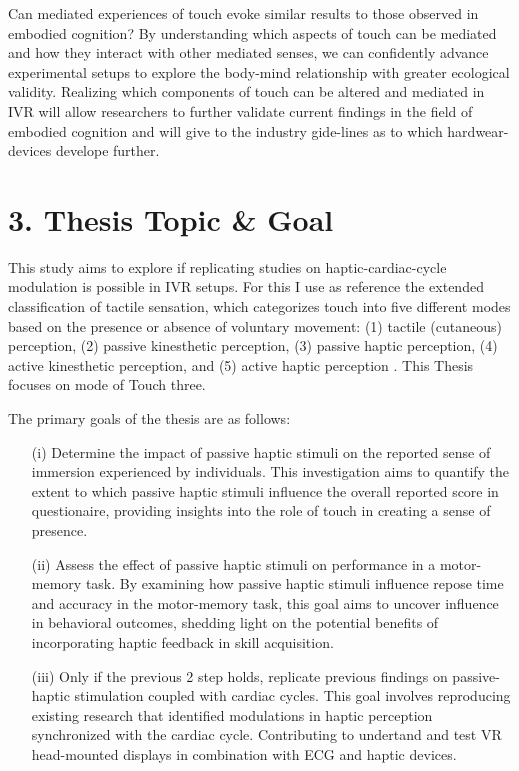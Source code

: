 \documentclass[12pt,oneside,openright]{report}
\begin{document}
Can mediated experiences of touch evoke similar results to those observed in embodied cognition? By understanding which aspects of touch can be mediated and how they interact with other mediated senses, we can confidently advance experimental setups to explore the body-mind relationship with greater ecological validity. Realizing which components of touch can be altered and mediated in IVR will allow researchers to further validate current findings in the field of embodied cognition and will give to the industry gide-lines as to which hardwear-devices develope further.  

\section*{3. Thesis Topic \& Goal}

This study aims to explore if replicating studies on haptic-cardiac-cycle modulation is possible in IVR setups. For this I use as reference the extended classification of tactile sensation, which categorizes touch into five different modes based on the presence or absence of voluntary movement: (1) tactile (cutaneous) perception, (2) passive kinesthetic perception, (3) passive haptic perception, (4) active kinesthetic perception, and (5) active haptic perception \cite{Healy2003HandbookOP}. This Thesis focuses on mode of Touch three. 

The primary goals of the thesis are as follows:
  \begin{itemize}
    \item[(i)] Determine the impact of passive haptic stimuli on the reported sense of immersion experienced by individuals. This investigation aims to quantify the extent to which passive haptic stimuli influence the overall reported score in questionaire, providing insights into the role of touch in creating a sense of presence.
    \item[(ii)] Assess the effect of passive haptic stimuli on performance in a motor-memory task. By examining how passive haptic stimuli influence repose time and accuracy in the motor-memory task, this goal aims to uncover influence in behavioral outcomes, shedding light on the potential benefits of incorporating haptic feedback in skill acquisition.
    \item[(iii)] Only if the previous 2 step holds, replicate previous findings on passive-haptic stimulation coupled with cardiac cycles. This goal involves reproducing existing research that identified modulations in haptic perception synchronized with the cardiac cycle. Contributing to undertand and test VR head-mounted displays in combination with ECG and haptic devices.
  \end{itemize}
\end{document}
